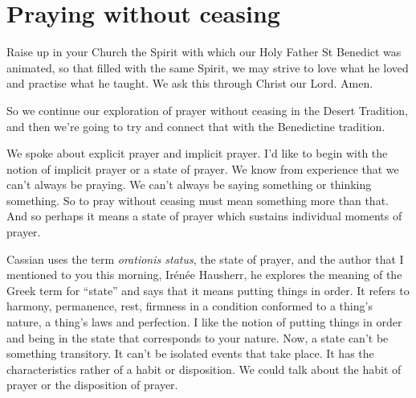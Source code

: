 \chapter{Praying without ceasing}

\begin{itshape}
Raise up in your Church the Spirit with which our Holy Father St Benedict was animated, so that filled with the same Spirit, we may strive to love what he loved and practise what he taught. We ask this through Christ our Lord. Amen.
\end{itshape}

\smallskip

So we continue our exploration of prayer without ceasing in the Desert Tradition, and then we're going to try and connect that with the Benedictine tradition.

We spoke about explicit prayer and implicit prayer. I'd like to begin with the notion of implicit prayer or a state of prayer. We know from experience that we can't always be praying. We can't always be saying something or thinking something. So to pray without ceasing must mean something more than that. And so perhaps it means a state of prayer which sustains individual moments of prayer.

Cassian uses the term \emph{orationis status}, the state of prayer, and the author that I mentioned to you this morning, Ir\'{e}n\'{e}e Hausherr, he explores the meaning of the Greek term for ``state'' and says that it means putting things in order. It refers to harmony, permanence, rest, firmness in a condition conformed to a thing's nature, a thing's laws and perfection. I like the notion of putting things in order and being in the state that corresponds to your nature. Now, a state can't be something transitory. It can't be isolated events that take place. It has the characteristics rather of a habit or disposition. We could talk about the habit of prayer or the disposition of prayer.

